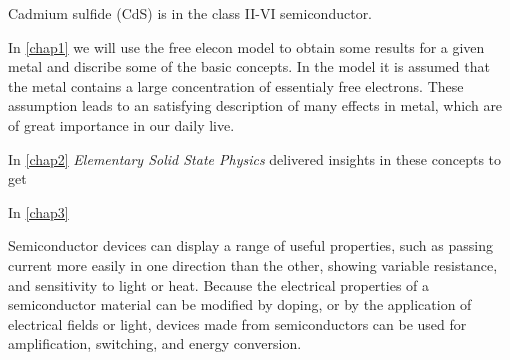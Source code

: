 Cadmium sulfide (CdS) is in the class II-VI semiconductor.

In \ref{chap1}  we will use the free elecon model 
to obtain some results for a given metal and discribe some of the
basic concepts. In the model it is assumed that the metal contains 
a large concentration of essentialy free electrons. These assumption
leads to an satisfying description of many effects in metal, which are of great importance in our daily live.

In \ref{chap2}  
\textit{Elementary Solid State Physics} \cite{elementary_SSP} delivered insights in these concepts to get 

 In \ref{chap3}  

 Semiconductor devices can display a range of useful properties, such as passing current more easily in one direction than the other, showing variable resistance, and sensitivity to light or heat. Because the electrical properties of a semiconductor material can be modified by doping, or by the application of electrical fields or light, devices made from semiconductors can be used for amplification, switching, and energy conversion.
